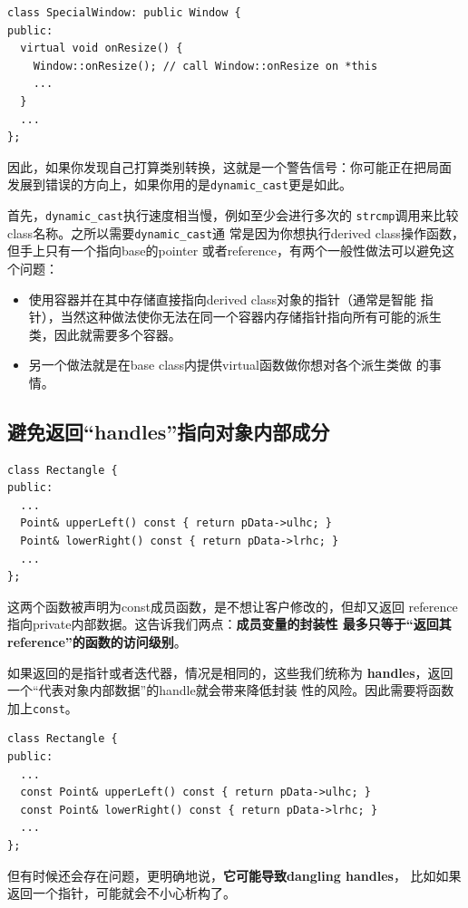 \begin{verbatim}
class SpecialWindow: public Window {
public:
  virtual void onResize() {
    Window::onResize(); // call Window::onResize on *this
    ...
  }
  ...
};
\end{verbatim}

因此，如果你发现自己打算类别转换，这就是一个警告信号：你可能正在把局面
发展到错误的方向上，如果你用的是\texttt{dynamic\_cast}更是如此。

首先，\texttt{dynamic\_cast}执行速度相当慢，例如至少会进行多次的
\texttt{strcmp}调用来比较class名称。之所以需要\texttt{dynamic\_cast}通
常是因为你想执行derived class操作函数，但手上只有一个指向base的pointer
或者reference，有两个一般性做法可以避免这个问题：

\begin{itemize}
\item 使用容器并在其中存储直接指向derived class对象的指针（通常是智能
  指针），当然这种做法使你无法在同一个容器内存储指针指向所有可能的派生
  类，因此就需要多个容器。
\item 另一个做法就是在base class内提供virtual函数做你想对各个派生类做
  的事情。
\end{itemize}

\subsection{避免返回“handles”指向对象内部成分}
\label{sec:Item-28}

\begin{verbatim}
class Rectangle {
public:
  ...
  Point& upperLeft() const { return pData->ulhc; }
  Point& lowerRight() const { return pData->lrhc; }
  ...
};
\end{verbatim}

这两个函数被声明为const成员函数，是不想让客户修改的，但却又返回
reference指向private内部数据。这告诉我们两点：\textbf{成员变量的封装性
  最多只等于“返回其reference”的函数的访问级别}。

如果返回的是指针或者迭代器，情况是相同的，这些我们统称为
\textbf{handles}，返回一个“代表对象内部数据”的handle就会带来降低封装
性的风险。因此需要将函数加上\texttt{const}。
\begin{verbatim}
class Rectangle {
public:
  ...
  const Point& upperLeft() const { return pData->ulhc; }
  const Point& lowerRight() const { return pData->lrhc; }
  ...
};
\end{verbatim}

但有时候还会存在问题，更明确地说，\textbf{它可能导致dangling handles}，
比如如果返回一个指针，可能就会不小心析构了。

